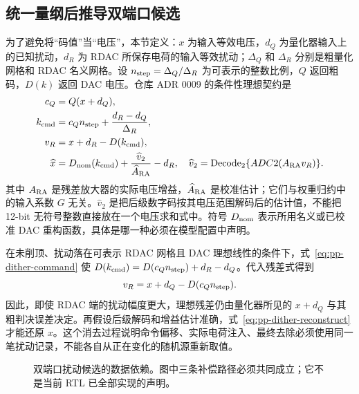 \subsection{统一量纲后推导双端口候选}
为了避免将“码值”当“电压”，本节定义：\(x\) 为输入等效电压，\(d_Q\) 为量化器输入上的已知扰动，\(d_R\) 为 RDAC 所保存电荷的输入等效扰动；\(\Delta_Q\) 和 \(\Delta_R\) 分别是粗量化网格和 RDAC 名义网格。设 \(n_{\rm step}=\Delta_Q/\Delta_R\) 为可表示的整数比例，\(Q\) 返回粗码，\(D(k)\) 返回 DAC 电压。仓库 ADR 0009 的条件性理想契约是
\begin{align}
c_Q&=Q(x+d_Q),\label{eq:pp-dither-q}\\
k_{\rm cmd}&=c_Q n_{\rm step}+\frac{d_R-d_Q}{\Delta_R},\label{eq:pp-dither-command}\\
v_R&=x+d_R-D(k_{\rm cmd}),\label{eq:pp-dither-residue}\\
\widehat{x}&=D_{\rm nom}(k_{\rm cmd})+
\frac{\widehat v_2}{\widehat A_{\rm RA}}-d_R,
\quad \widehat v_2=\operatorname{Decode}_{2}\{ADC2(A_{\rm RA}v_R)\}.
\label{eq:pp-dither-reconstruct}
\end{align}
其中 \(A_{\rm RA}\) 是残差放大器的实际电压增益，\(\widehat A_{\rm RA}\) 是校准估计；它们与权重归约中的输入系数 \(G\) 无关。\(\widehat v_2\) 是把后级数字码按其电压范围解码后的估计值，不能把 12-bit 无符号整数直接放在一个电压求和式中。符号 \(D_{\rm nom}\) 表示所用名义或已校准 DAC 重构函数，具体是哪一种必须在模型配置中声明。

在未削顶、扰动落在可表示 RDAC 网格且 DAC 理想线性的条件下，式~\eqref{eq:pp-dither-command} 使 \(D(k_{\rm cmd})=D(c_Qn_{\rm step})+d_R-d_Q\)。代入残差式得到
\begin{equation}
v_R=x+d_Q-D(c_Qn_{\rm step}).
\end{equation}
因此，即使 RDAC 端的扰动幅度更大，理想残差仍由量化器所见的 \(x+d_Q\) 与其粗判决误差决定。再假设后级解码和增益估计准确，式~\eqref{eq:pp-dither-reconstruct} 才能还原 \(x\)。这个消去过程说明命令偏移、实际电荷注入、最终去除必须使用同一笔扰动记录，不能各自从正在变化的随机源重新取值。

\begin{figure}[htbp]\centering
{}
\caption{双端口扰动候选的数据依赖。图中三条补偿路径必须共同成立；它不是当前 RTL 已全部实现的声明。}
\end{figure}

